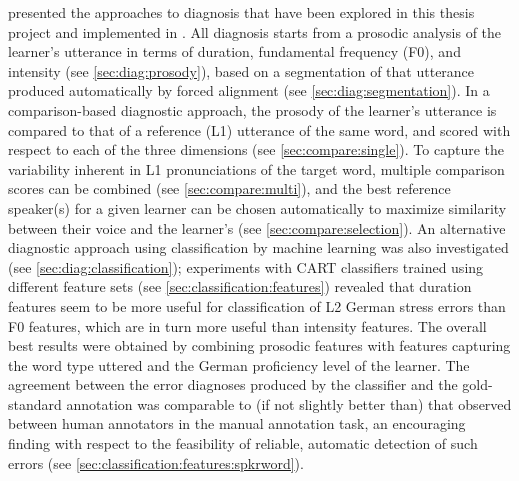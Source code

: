 %
%
 presented the approaches to diagnosis that have been explored in this thesis project and implemented in . All diagnosis starts from a prosodic analysis of the learner's utterance in terms of duration, fundamental frequency (F0), and intensity (see \cref{sec:diag:prosody}), based on a segmentation of that utterance produced automatically by forced alignment (see \cref{sec:diag:segmentation}). 
	In a comparison-based diagnostic approach, the prosody of the learner's utterance is compared to that of a reference (L1) utterance of the same word, and scored with respect to each of the three dimensions (see \cref{sec:compare:single}). 
	To capture the variability inherent in L1 pronunciations of the target word, multiple comparison scores 
	can be combined (see \cref{sec:compare:multi}), and the best reference speaker(s) for a given learner can be chosen automatically to maximize similarity between their voice and the learner's (see \cref{sec:compare:selection}). 
	An alternative diagnostic approach using classification by machine learning was also investigated (see \cref{sec:diag:classification});
	experiments with CART classifiers trained using different feature sets (see \cref{sec:classification:features}) revealed that duration features seem to be more useful for classification of L2 German stress errors than F0 features, which are in turn more useful than intensity features. The overall best results were obtained by  combining prosodic features with features capturing the word type uttered and the German proficiency level of the learner. 
	The agreement between the error diagnoses produced by the classifier and the gold-standard annotation was comparable to (if not slightly better than) that observed between human annotators in the manual annotation task, an encouraging finding with respect to the feasibility of reliable, automatic detection of such errors (see \cref{sec:classification:features:spkrword}). 
